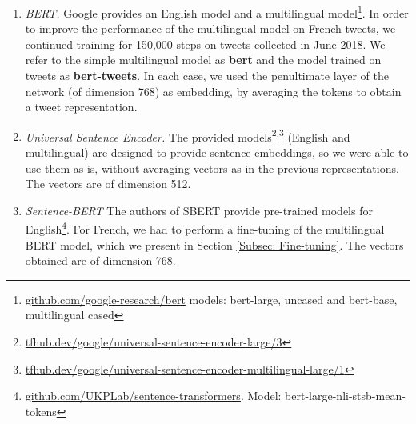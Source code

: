 \begin{enumerate}
\item \textit{BERT.} Google provides an English model and a multilingual model\footnote{\url{github.com/google-research/bert} models: bert-large, uncased and bert-base, multilingual cased}. In order to improve the performance of the multilingual model on French tweets, we continued training for 150,000 steps on tweets collected in June 2018. We refer to the simple multilingual model as \textbf{bert} and the model trained on tweets as \textbf{bert-tweets}. In each case, we used the penultimate layer of the network (of dimension 768) as embedding, by averaging the tokens to obtain a tweet representation.

\item \textit{Universal Sentence Encoder.} The provided models\footnote{\url{tfhub.dev/google/universal-sentence-encoder-large/3}}\textsuperscript{,}\footnote{\url{tfhub.dev/google/universal-sentence-encoder-multilingual-large/1}}
    (English and multilingual) are designed to provide sentence embeddings, so we were able to use them as is, without averaging vectors
    as in the previous representations. The vectors are of dimension 512.

\item \textit{Sentence-BERT} The authors of SBERT provide pre-trained models for English\footnote{\url{github.com/UKPLab/sentence-transformers}. Model: bert-large-nli-stsb-mean-tokens}. For French, we had to perform a fine-tuning of the multilingual BERT model, which we present in Section \ref{Subsec: Fine-tuning}. The vectors obtained are of dimension 768.
\end{enumerate}


